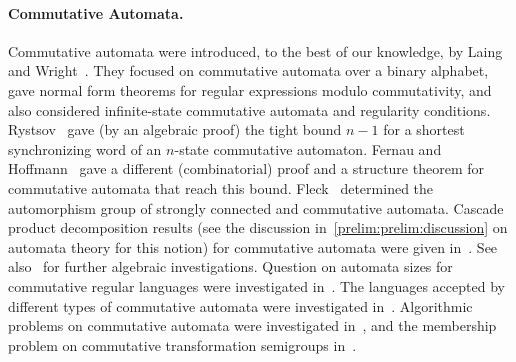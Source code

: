\paragraph{Commutative Automata.} Commutative automata
were introduced, to the best of our knowledge,
by Laing and Wright~\cite{laingwright62}.
They focused on commutative automata over a binary alphabet, gave
normal form theorems for regular expressions modulo commutativity,
and also considered infinite-state commutative automata
and regularity conditions. 
Rystsov~\cite{Rys96} gave (by an algebraic proof) the tight bound $n-1$
for a shortest synchronizing word of an $n$-state commutative automaton.
Fernau and Hoffmann~\cite{FernauHoffmann19} gave a different (combinatorial)
proof and a structure theorem for commutative automata that
reach this bound.
Fleck~\cite{DBLP:journals/jacm/Fleck62} determined the automorphism group
of strongly connected and commutative automata.
Cascade product decomposition results (see the discussion in~\cref{prelim:prelim:discussion} on automata theory for this notion) for commutative automata
were given in~\cite{Gelderie2010,DBLP:conf/lata/Gelderie11}.
See also~\cite{DBLP:journals/actaC/EsikI81a,DBLP:journals/actaC/EsikI81,DBLP:journals/actaC/Imreh81,Peak65} for further algebraic investigations.
Question on automata sizes for commutative regular languages
were investigated in~\cite{DBLP:journals/iandc/Hoffmann24,DBLP:journals/ijfcs/Hoffmann23a}.
The languages accepted by different types of commutative automata
were investigated in~\cite{DBLP:journals/actaC/AlmeidaEP17,
	DBLP:conf/cai/Hoffmann19,
	DBLP:conf/wia/Hoffmann21,
	Hoffmann23a,
	DBLP:journals/iandc/Hoffmann24,
	Pin86,
	DBLP:reference/hfl/Pin97}.
Algorithmic problems on commutative automata were investigated in~\cite{DBLP:journals/corr/abs-2108-05244},
and the membership problem on commutative transformation semigroups in~\cite{DBLP:journals/iandc/Beaudry88}.
 
